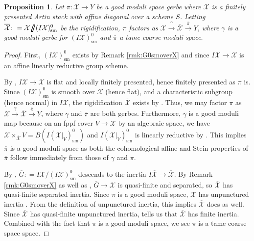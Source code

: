 \documentclass{amsart}
\newtheorem{proposition}[proposition]{Proposition}
\theoremstyle{definition}
\newcommand{\cX}{\mathcal{X}}
\newcommand{\sm}{\mathrm{sm}}
\newcommand{\thickslash}{\mathbin{\!\!\pmb{\fatslash}}}
\begin{document}
	\begin{proposition}\label{prop:gerbe-connected}
		Let $\pi\colon\cX\to Y$ be a good moduli space gerbe where $\cX$ is a finitely presented Artin stack with affine diagonal over a scheme $S$. Letting $\overline{\cX}\colon=\cX\thickslash(I\cX)^0_{\sm}$ be the rigidification, $\pi$ factors as $\cX\xrightarrow{\gamma}\overline{\cX}\xrightarrow{\overline{\pi}} Y$, where $\gamma$ is a good moduli gerbe for $(I\cX)^0_{\sm}$ and $\overline{\pi}$ a tame coarse moduli space.
	\end{proposition}
	\begin{proof}
		First, $(I\cX)^0_{\sm}$ exists by Remark \ref{rmk:G0smoverX} and since $I\cX\to\cX$ is an affine linearly reductive group scheme.
		
		By \cite[Tag 06QJ]{stacks-project}, $I\cX\to\cX$ is flat and locally finitely presented, hence finitely presented as $\pi$ is. Since $(I\cX)^0_{\sm}$ is smooth over $\cX$ (hence flat), and a characteristic subgroup (hence normal) in $I\cX$, the rigidification $\overline{\cX}$ exists by \cite[Theorem A.1]{AbramovichOlssonVistoliTame}. 
		Thus, we may factor $\pi$ as $\cX\xrightarrow{\gamma}\overline{\cX}\xrightarrow{\overline{\pi}} Y$, where $\gamma$ and $\overline{\pi}$ are both gerbes. Furthermore, $\gamma$ is a good moduli map because on an fppf cover $V\to\overline{\cX}$ by an algebraic space, we have $\cX\times_{\overline{\cX}}V=B(I(\cX|_V)^0_{\sm})$ and $I(\cX|_V)^0_{\sm}$ is linearly reductive by \cite[Theorem 9.9]{AHRetalelocal}. This implies $\overline{\pi}$ is a good moduli space as both the cohomological affine and Stein properties of $\overline{\pi}$ follow immediately from those of $\gamma$ and $\pi$.
		
		By \cite[Remark A.2]{AbramovichOlssonVistoliTame}, $\overline{G}\colon=I\cX/(I\cX)^0_{\sm}$ descends to the inertia $I\overline{\cX} \to \overline{\cX}$. By Remark \ref{rmk:G0smoverX} as well as \cite[Theorem 9.9]{AHRetalelocal}, $\overline{G}\to\cX$ is quasi-finite and separated, so $\overline{\cX}$ has quasi-finite separated inertia. Since $\pi$ is a good moduli space, $\cX$ has unpunctured inertia \cite[Theorem 4.1]{AHLH}. From the definition of unpunctured inertia, this implies $\overline{\cX}$ does as well. Since $\overline{\cX}$ has quasi-finite unpunctured inertia, \cite[Proposition 3.54]{AHRetalelocal} tells us that $\overline{\cX}$ has finite inertia. Combined with the fact that $\overline{\pi}$ is a good moduli space, we see $\overline{\pi}$ is a tame coarse space space.
	\end{proof}
	
\end{document}
